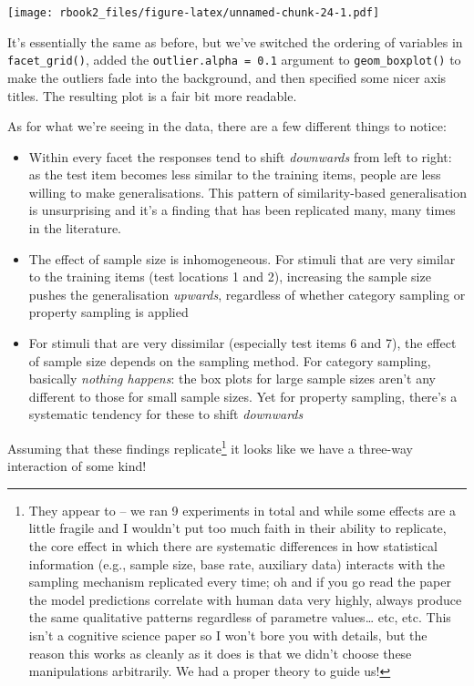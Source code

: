 \documentclass[]{book}
\providecommand{\tightlist}{%
  \setlength{\itemsep}{0pt}\setlength{\parskip}{0pt}}
\let\rmarkdownfootnote\footnote%
\def\footnote{\protect\rmarkdownfootnote}
\begin{document}
\texttt{[image: rbook2\_files/figure-latex/unnamed-chunk-24-1.pdf]}

It's essentially the same as before, but we've switched the ordering of variables in \texttt{facet\_grid()}, added the \texttt{outlier.alpha\ =\ 0.1} argument to \texttt{geom\_boxplot()} to make the outliers fade into the background, and then specified some nicer axis titles. The resulting plot is a fair bit more readable.

As for what we're seeing in the data, there are a few different things to notice:

\begin{itemize}
\tightlist
\item
  Within every facet the responses tend to shift \emph{downwards} from left to right: as the test item becomes less similar to the training items, people are less willing to make generalisations. This pattern of similarity-based generalisation is unsurprising and it's a finding that has been replicated many, many times in the literature.
\item
  The effect of sample size is inhomogeneous. For stimuli that are very similar to the training items (test locations 1 and 2), increasing the sample size pushes the generalisation \emph{upwards}, regardless of whether category sampling or property sampling is applied
\item
  For stimuli that are very dissimilar (especially test items 6 and 7), the effect of sample size depends on the sampling method. For category sampling, basically \emph{nothing happens}: the box plots for large sample sizes aren't any different to those for small sample sizes. Yet for property sampling, there's a systematic tendency for these to shift \emph{downwards}
\end{itemize}

Assuming that these findings replicate\footnote{They appear to -- we ran 9 experiments in total and while some effects are a little fragile and I wouldn't put too much faith in their ability to replicate, the core effect in which there are systematic differences in how statistical information (e.g., sample size, base rate, auxiliary data) interacts with the sampling mechanism replicated every time; oh and if you go read the paper the model predictions correlate with human data very highly, always produce the same qualitative patterns regardless of parametre values\ldots{} etc, etc. This isn't a cognitive science paper so I won't bore you with details, but the reason this works as cleanly as it does is that we didn't choose these manipulations arbitrarily. We had a proper theory to guide us!} it looks like we have a three-way interaction of some kind!
\end{document}
